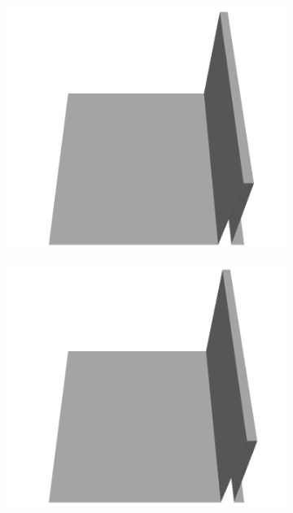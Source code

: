 \documentclass[../document.tex]{subfiles}
\begin{document}
\begin{figure}[H]
\begin{subfigure}[b]{0.065\textwidth}
    \includegraphics[width=\linewidth]{../img/5/custom_patches/walls_front/all/11-3d.png}
    \end{subfigure}
    \begin{subfigure}[b]{0.065\textwidth}
    \includegraphics[width=\linewidth]{../img/5/custom_patches/walls_front/all/10-3d.png}
    \end{subfigure}
    \begin{subfigure}[b]{0.065\textwidth}

\end{subfigure}
\end{figure}
\end{document}

